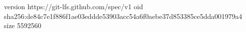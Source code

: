 version https://git-lfs.github.com/spec/v1
oid sha256:de84c7e1f886f1ae03eddde53903acc54a6f0aebe37d853385ce5dda001979a4
size 5592560
